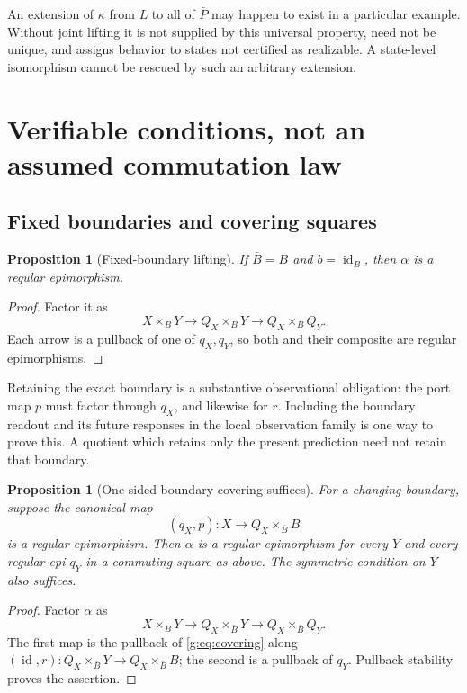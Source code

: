 \documentclass[11pt]{article}
\newtheorem{proposition}[theorem]{Proposition}
\theoremstyle{definition}
\theoremstyle{remark}\newtheorem{remark}[theorem]{Remark}
\newcommand{\id}{\operatorname{id}}
\begin{document}
An extension of $\kappa$ from $L$ to all of $\bar P$ may happen to exist
in a particular example. Without joint lifting it is not supplied by this
universal property, need not be unique, and assigns behavior to states not
certified as realizable. A state-level isomorphism cannot be rescued by such
an arbitrary extension.

\section{Verifiable conditions, not an assumed commutation law}
\subsection{Fixed boundaries and covering squares}
\begin{proposition}[Fixed-boundary lifting]\label{g:prop:fixed}
If $\bar B=B$ and $b=\id_B$, then $\alpha$ is a regular epimorphism.
\end{proposition}
\begin{proof}
Factor it as
\[
 X\times_B Y\longrightarrow Q_X\times_B Y
                  \longrightarrow Q_X\times_B Q_Y.
\]
Each arrow is a pullback of one of $q_X,q_Y$, so both and their composite
are regular epimorphisms.
\end{proof}

Retaining the exact boundary is a substantive observational obligation:
the port map $p$ must factor through $q_X$, and likewise for $r$.
Including the boundary readout and its future responses in the local
observation family is one way to prove this. A quotient which retains only
the present prediction need not retain that boundary.

\begin{proposition}[One-sided boundary covering suffices]
\label{g:prop:covering}
For a changing boundary, suppose the canonical map
\begin{equation}\label{g:eq:covering}
 (q_X,p):X\longrightarrow Q_X\times_{\bar B}B
\end{equation}
is a regular epimorphism. Then $\alpha$ is a regular epimorphism for every
$Y$ and every regular-epi $q_Y$ in a commuting square as above. The
symmetric condition on $Y$ also suffices.
\end{proposition}
\begin{proof}
Factor $\alpha$ as
\[
 X\times_B Y\longrightarrow Q_X\times_{\bar B}Y
                    \longrightarrow Q_X\times_{\bar B}Q_Y.
\]
The first map is the pullback of \eqref{g:eq:covering} along
$(\id,r):Q_X\times_{\bar B}Y\to Q_X\times_{\bar B}B$; the second is
a pullback of $q_Y$. Pullback stability proves the assertion.
\end{proof}
\end{document}
